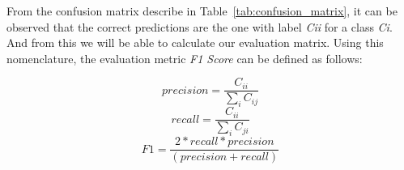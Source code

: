 \documentclass[sigconf]{acmart}
\theoremstyle{break}
\begin{document}
    \begin{table}[h!]
        \centering
        \small
        \caption{Confusion Matrix}
        \label{tab:confusion_matrix}
    \end{table}
    
    From the confusion matrix describe in Table~\ref{tab:confusion_matrix}, it can be observed that the correct predictions are the one with label {\em Cii} for a class {\em Ci}. And from this we will be able to calculate our evaluation matrix. Using
    this nomenclature, the evaluation metric {\em F1 Score} can be defined as follows:
    
    
    \begin{equation}
        \mathit{precision} = \frac{C_{ii}}{\sum\limits_{i}C_{ij}}
    \end{equation}
        \begin{equation}
        \mathit{recall} = \frac{C_{ii}}{\sum\limits_{i}C_{ji}}
    \end{equation}
        \begin{equation}
        \mathit{F1} = \frac{2*\mathit{recall}*\mathit{precision}}{(\mathit{precision} + \mathit{recall})}
    \end{equation}
\end{document}
